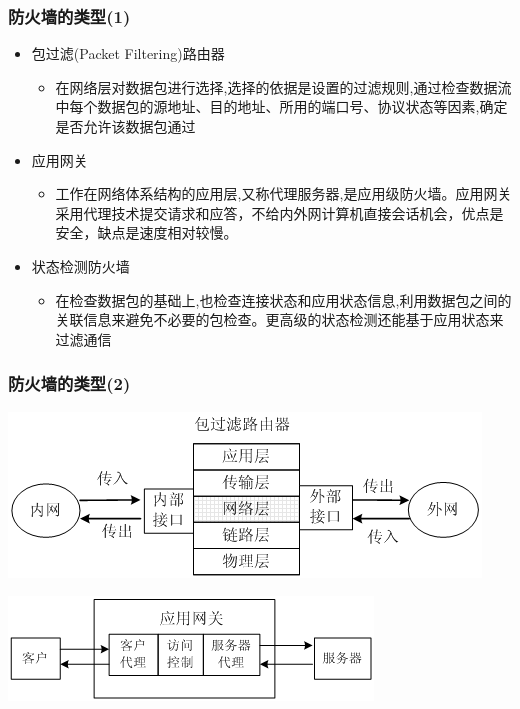 \documentclass[xcolor=svgnames,presentation]{beamer}
\begin{document}
\begin{frame}
\frametitle{防火墙的类型(1)}
\label{sec-1-3}
\begin{itemize}

\item 包过滤(Packet Filtering)路由器
\label{sec-1-3-1}%
\begin{itemize}

\item 在网络层对数据包进行选择,选择的依据是设置的过滤规则,通过检查数据流中每个数据包的源地址、目的地址、所用的端口号、协议状态等因素,确定是否允许该数据包通过
\label{sec-1-3-1-1}%
\end{itemize} %

\item 应用网关
\label{sec-1-3-2}%
\begin{itemize}

\item 工作在网络体系结构的应用层,又称代理服务器,是应用级防火墙。应用网关采用代理技术提交请求和应答，不给内外网计算机直接会话机会，优点是安全，缺点是速度相对较慢。
\label{sec-1-3-2-1}%
\end{itemize} %

\item 状态检测防火墙
\label{sec-1-3-3}%
\begin{itemize}

\item 在检查数据包的基础上,也检查连接状态和应用状态信息,利用数据包之间的关联信息来避免不必要的包检查。更高级的状态检测还能基于应用状态来过滤通信
\label{sec-1-3-3-1}%
\end{itemize} %
\end{itemize} %
\end{frame}
\begin{frame}
\frametitle{防火墙的类型(2)}
\label{sec-1-4}
\label{sec-1-4-1}

\includegraphics[width=.9\linewidth]{img/firewall3.png}
\label{sec-1-4-2}

\includegraphics[width=.9\linewidth]{img/firewall4.png}
\end{frame}
\end{document}
